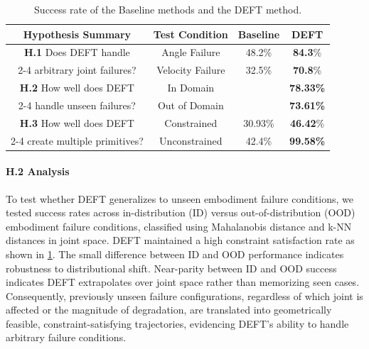\begin{table}[h]
\centering
\begin{tabular}{|c|c|c|c|}
\hline
\textbf{Hypothesis Summary} & \textbf{Test Condition}  & \textbf{Baseline} & \textbf{DEFT} \\ \hline
\textbf{H.1} Does DEFT handle & Angle Failure & 48.2\% & \textbf{84.3}\% \\ \cline{2-4}
arbitrary joint failures?& Velocity Failure & 32.5\% & \textbf{70.8}\% \\ \hline
\textbf{H.2} How well does DEFT & In Domain & \cellcolor{black} & \textbf{78.33\%} \\ \cline{2-4}
 handle unseen failures?& Out of Domain & \cellcolor{black} & \textbf{73.61\%} \\ \hline
\textbf{H.3} How well does DEFT  & Constrained & 30.93\% & \textbf{46.42}\% \\ \cline{2-4}
create multiple primitives?  & Unconstrained & 42.4\% & \textbf{99.58\%} \\ \hline

\end{tabular}
\caption{Success rate of the Baseline methods and the DEFT method. \vspace{-10pt}}
\label{tab:performance}
\end{table}



\paragraph{\textbf{H.2} Analysis}
To test whether DEFT generalizes to unseen embodiment failure conditions, we tested success rates across in-distribution (ID) versus out-of-distribution (OOD) embodiment failure conditions, classified using Mahalanobis distance and k-NN distances in joint space. DEFT maintained a high constraint satisfaction rate as shown in \cref{tab:performance}. The small difference between ID and OOD performance indicates robustness to distributional shift. 
Near-parity between ID and OOD success 
indicates DEFT extrapolates over joint space rather than memorizing seen cases. Consequently, previously unseen failure configurations, regardless of which joint is affected or the magnitude of degradation, are translated into geometrically feasible, constraint-satisfying trajectories, evidencing DEFT’s ability to handle arbitrary failure conditions.




